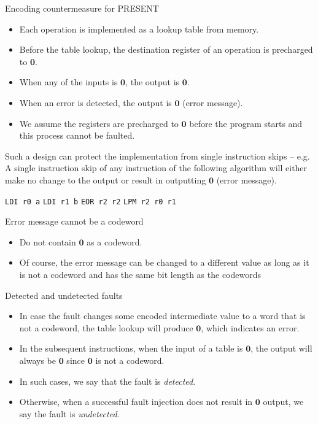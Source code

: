 \begin{frame}{Encoding countermeasure for PRESENT}
\begin{itemize}
    \item Each operation is implemented as a lookup table from memory.
    \item Before the table lookup, the destination register of an operation is precharged to $\boldsymbol{0}$.
    \item When any of the inputs is $\boldsymbol{0}$, the output is $\boldsymbol{0}$.
    \item When an error is detected, the output is $\boldsymbol{0}$ (error message).
    \item We assume the registers are precharged to $\boldsymbol{0}$ before the program starts and this process cannot be faulted.
\end{itemize}
Such a design can protect the implementation from single instruction skips -- e.g. A single instruction skip of any instruction of the following algorithm will either make no change to the output or result in outputting $\boldsymbol{0}$ (error message).
{
\setlength{\interspacetitleruled}{0pt}%
\setlength{\algotitleheightrule}{0pt}%
\begin{algorithm}[H]
	\texttt{LDI r0 a}
\texttt{LDI r1 b}
	\texttt{EOR r2 r2}
	\texttt{LPM r2 r0 r1}
\end{algorithm}
}
\end{frame}

\begin{frame}{Error message cannot be a codeword}
    \begin{itemize}
        \item Do not contain $\boldsymbol{0}$ as a codeword.
        \item Of course, the error message can be changed to a different value as long as it is not a codeword and has the same bit length as the codewords
    \end{itemize}
\end{frame}

\begin{frame}{Detected and undetected faults}
    \begin{itemize}
        \item In case the fault changes some encoded intermediate value to a word that is not a codeword, the table lookup will produce $\boldsymbol{0}$, which indicates an error.
        \item In the subsequent instructions, when the input of a table is $\boldsymbol{0}$, the output will always be $\boldsymbol{0}$ since $\boldsymbol{0}$ is not a codeword.
         \item In such cases, we say that the fault is \textit{detected}.
        \item Otherwise, when a successful fault injection does not result in $\boldsymbol{0}$ output, we say the fault is \textit{undetected}.
    \end{itemize}
\end{frame}


